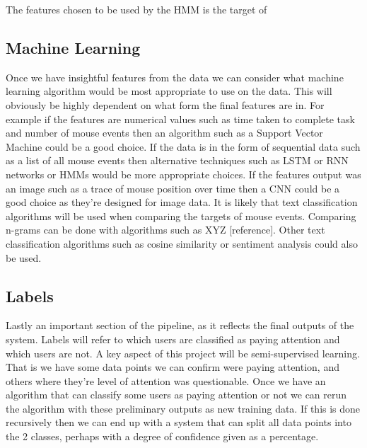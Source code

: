 \documentclass{article}
\begin{document}

The features chosen to be used by the HMM is the target of 

\subsection{Machine Learning}


Once we have insightful features from the data we can consider what machine learning algorithm would be most appropriate to use on the data.
This will obviously be highly dependent on what form the final features are in.
For example if the features are numerical values such as time taken to complete task and number of mouse events then an algorithm such as a Support Vector Machine could be a good choice.
If the data is in the form of sequential data such as a list of all mouse events then alternative techniques such as LSTM or RNN networks or HMMs would be more appropriate choices.
If the features output was an image such as a trace of mouse position over time then a CNN could be a good choice as they're designed for image data.
It is likely that text classification algorithms will be used when comparing the targets of mouse events.
Comparing n-grams can be done with algorithms such as XYZ [reference].
Other text classification algorithms such as cosine similarity or sentiment analysis could also be used.

\subsection{Labels}


Lastly an important section of the pipeline, as it reflects the final outputs of the system.
Labels will refer to which users are classified as paying attention and which users are not.
A key aspect of this project will be semi-supervised learning.
That is we have some data points we can confirm were paying attention, and others where they're level of attention was questionable.
Once we have an algorithm that can classify some users as paying attention or not we can rerun the algorithm with these preliminary outputs as new training data.
If this is done recursively then we can end up with a system that can split all data points into the 2 classes, perhaps with a degree of confidence given as a percentage.
\end{document}
